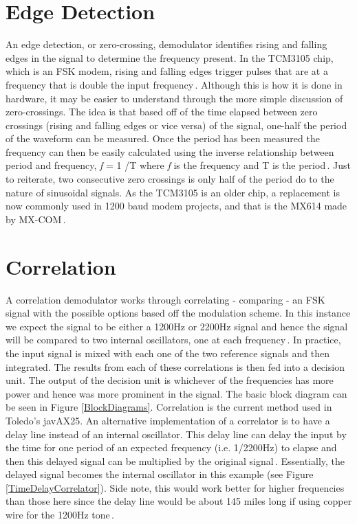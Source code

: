 \section{Edge Detection}
An edge detection, or zero-crossing, demodulator identifies rising and falling edges in the signal to determine the frequency present. In the TCM3105 chip, which is an FSK modem, rising and falling edges trigger pulses that are at a frequency that is double the input frequency\,\cite{Instruments1994}. Although this is how it is done in hardware, it may be easier to understand through the more simple discussion of zero-crossings. The idea is that based off of the time elapsed between zero crossings (rising and falling edges or vice versa) of the signal, one-half the period of the waveform can be measured. Once the period has been measured the frequency can then be easily calculated using the inverse relationship between period and frequency, \textit{f} = 1 /T where \textit{f} is the frequency and T is the period\,\cite{Seguine2006}. Just to reiterate, two consecutive zero crossings is only half of the period do to the nature of sinusoidal signals. As the TCM3105 is an older chip, a replacement is now commonly used in 1200 baud modem projects, and that is the MX614 made by MX-COM\,\cite{Mitrenga2000}.

\section{Correlation}
A correlation demodulator works through correlating - comparing - an FSK signal with the possible options based off the modulation scheme. In this instance we expect the signal to be either a 1200Hz or 2200Hz signal and hence the signal will be compared to two internal oscillators, one at each frequency\,\cite{Rowe2014}. In practice, the input signal is mixed with each one of the two reference signals and then integrated. The results from each of these correlations is then fed into a decision unit. The output of the decision unit is whichever of the frequencies has more power and hence was more prominent in the signal. The basic block diagram can be seen in Figure \ref{BlockDiagrams}. Correlation is the current method used in Toledo's javAX25. An alternative implementation of a correlator is to have a delay line instead of an internal oscillator. This delay line can delay the input by the time for one period of an expected frequency (i.e. 1/2200Hz) to elapse and then this delayed signal can be multiplied by the original signal\,\cite{Seguine2006}. Essentially, the delayed signal becomes the internal oscillator in this example (see Figure \ref{TimeDelayCorrelator}). Side note, this would work better for higher frequencies than those here since the delay line would be about 145 miles long if using copper wire for the 1200Hz tone\,\cite{HowFastIsElectricity}.

